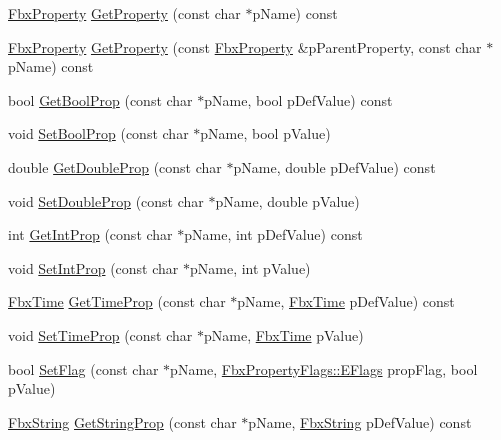 \begin{DoxyCompactItemize}
\hyperlink{class_fbx_property}{Fbx\+Property} \hyperlink{class_fbx_i_o_settings_aa02805702152a4ef56d337c25b12d42b}{Get\+Property} (const char $\ast$p\+Name) const
\item 
\hyperlink{class_fbx_property}{Fbx\+Property} \hyperlink{class_fbx_i_o_settings_aedc91a76523e1fb2fe015901afd5d8bc}{Get\+Property} (const \hyperlink{class_fbx_property}{Fbx\+Property} \&p\+Parent\+Property, const char $\ast$p\+Name) const
\item 
bool \hyperlink{class_fbx_i_o_settings_aa30a3e515f60aa1fcbd82b6b34994ad0}{Get\+Bool\+Prop} (const char $\ast$p\+Name, bool p\+Def\+Value) const
\item 
void \hyperlink{class_fbx_i_o_settings_ad2c660ef846b66dcf569079299391745}{Set\+Bool\+Prop} (const char $\ast$p\+Name, bool p\+Value)
\item 
double \hyperlink{class_fbx_i_o_settings_a4d068caa98d8183a45b520d6ade6ad41}{Get\+Double\+Prop} (const char $\ast$p\+Name, double p\+Def\+Value) const
\item 
void \hyperlink{class_fbx_i_o_settings_ae97bbc6c4ae0534788dba82e3cfd0c4f}{Set\+Double\+Prop} (const char $\ast$p\+Name, double p\+Value)
\item 
int \hyperlink{class_fbx_i_o_settings_a3ab14ccc4a1ecb92bc94c61597d50d08}{Get\+Int\+Prop} (const char $\ast$p\+Name, int p\+Def\+Value) const
\item 
void \hyperlink{class_fbx_i_o_settings_a5284810e44344eb94b1dcdd97af4a8a3}{Set\+Int\+Prop} (const char $\ast$p\+Name, int p\+Value)
\item 
\hyperlink{class_fbx_time}{Fbx\+Time} \hyperlink{class_fbx_i_o_settings_a369d87d5f1785484917a44abd5f70bd3}{Get\+Time\+Prop} (const char $\ast$p\+Name, \hyperlink{class_fbx_time}{Fbx\+Time} p\+Def\+Value) const
\item 
void \hyperlink{class_fbx_i_o_settings_a780a8567ad7916be8914e9a22c09f1a5}{Set\+Time\+Prop} (const char $\ast$p\+Name, \hyperlink{class_fbx_time}{Fbx\+Time} p\+Value)
\item 
bool \hyperlink{class_fbx_i_o_settings_a3a729325e682c916226227e4ebcebd58}{Set\+Flag} (const char $\ast$p\+Name, \hyperlink{class_fbx_property_flags_afabfa7e0949aac8a7dcdf8a141867e99}{Fbx\+Property\+Flags\+::\+E\+Flags} prop\+Flag, bool p\+Value)
\item 
\hyperlink{class_fbx_string}{Fbx\+String} \hyperlink{class_fbx_i_o_settings_ab3e057be50be4fbeae6e70ceb38cf1fa}{Get\+String\+Prop} (const char $\ast$p\+Name, \hyperlink{class_fbx_string}{Fbx\+String} p\+Def\+Value) const
\item 

\end{DoxyCompactItemize}
